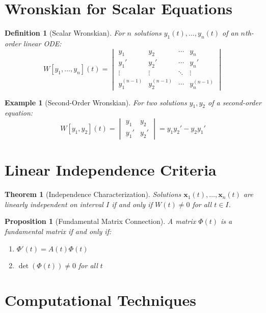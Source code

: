 \documentclass[12pt]{article}
\newtheorem{definition}{Definition}
\newtheorem{theorem}{Theorem}
\newtheorem{proposition}{Proposition}
\newtheorem{example}{Example}
\begin{document}
\section{Wronskian for Scalar Equations}

\begin{definition}[Scalar Wronskian]
For $n$ solutions $y_{1}(t), \ldots, y_{n}(t)$ of an $n$th-order linear ODE:
$$W[y_{1}, \ldots, y_{n}](t) = \begin{vmatrix}
y_{1} & y_{2} & \cdots & y_{n} \\
y_{1}' & y_{2}' & \cdots & y_{n}' \\
\vdots & \vdots & \ddots & \vdots \\
y_{1}^{(n-1)} & y_{2}^{(n-1)} & \cdots & y_{n}^{(n-1)}
\end{vmatrix}$$
\end{definition}

\begin{example}[Second-Order Wronskian]
For two solutions $y_{1}, y_{2}$ of a second-order equation:
$$W[y_{1}, y_{2}](t) = \begin{vmatrix} y_{1} & y_{2} \\ y_{1}' & y_{2}' \end{vmatrix} = y_{1} y_{2}' - y_{2} y_{1}'$$
\end{example}

\section{Linear Independence Criteria}

\begin{theorem}[Independence Characterization]
Solutions $\mathbf{x}_{1}(t), \ldots, \mathbf{x}_{n}(t)$ are linearly independent on interval $I$ if and only if $W(t) \neq 0$ for all $t \in I$.
\end{theorem}

\begin{proposition}[Fundamental Matrix Connection]
A matrix $\Phi(t)$ is a fundamental matrix if and only if:
\begin{enumerate}
\item $\Phi'(t) = A(t)\Phi(t)$
\item $\det(\Phi(t)) \neq 0$ for all $t$
\end{enumerate}
\end{proposition}

\section{Computational Techniques}
\end{document}
